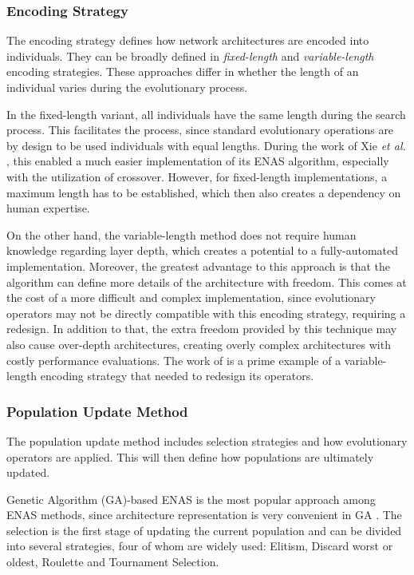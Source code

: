 \documentclass[10pt,        %
               a4paper,     %
               journal,     %
               ]{IEEEtran}
\begin{document}
\subsubsection{Encoding Strategy}
The encoding strategy defines how network architectures are encoded into individuals. They can be broadly defined in
\textit{fixed-length} and \textit{variable-length} encoding strategies. These approaches differ in whether the length
of an individual varies during the evolutionary process.

In the fixed-length variant, all individuals have the same length during the search process. This facilitates
the process, since standard evolutionary operations are by design to be used individuals with equal lengths. During
the work of Xie \textit{et al.} \cite{xie2017genetic}, this enabled a much easier implementation of its ENAS
algorithm, especially with the utilization of crossover. However, for fixed-length implementations, a maximum
length has to be established, which then also creates a dependency on human expertise.

On the other hand, the variable-length method does not require human knowledge regarding layer depth, which creates
a potential to a fully-automated implementation. Moreover, the greatest advantage to this approach is that the algorithm
can define more details of the architecture with freedom. This comes at the cost of a more difficult and complex implementation,
since evolutionary operators may not be directly compatible with this encoding strategy, requiring a redesign. In addition to that,
the extra freedom provided by this technique may also cause over-depth architectures, creating overly complex architectures
with costly performance evaluations. The work of \cite{sun2019evolving} is a prime example of a variable-length encoding strategy
that needed to redesign its operators.

\subsubsection{Population Update Method}
\label{pop}
The population update method includes selection strategies and how evolutionary operators are applied. This will then
define how populations are ultimately updated.

Genetic Algorithm (GA)-based ENAS is the most popular approach among ENAS methods, since architecture representation is
very convenient in GA \cite{liu2021survey}. The selection is the first stage of updating the current population and can
be divided into several strategies, four of whom are widely used: Elitism, Discard worst or oldest, Roulette and Tournament
Selection.
\end{document}
